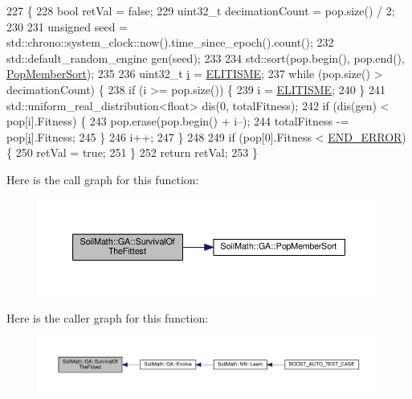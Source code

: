 \begin{DoxyCode}
227                                                                     \{
228   \textcolor{keywordtype}{bool} retVal = \textcolor{keyword}{false};
229   uint32\_t decimationCount = pop.size() / 2;
230 
231   \textcolor{keywordtype}{unsigned} seed = std::chrono::system\_clock::now().time\_since\_epoch().count();
232   std::default\_random\_engine gen(seed);
233 
234   std::sort(pop.begin(), pop.end(), \hyperlink{class_soil_math_1_1_g_a_a1e950022fa3ea792a36cbc62f9b8528b}{PopMemberSort});
235 
236   uint32\_t \hyperlink{_comparision_pictures_2_createtest_image_8m_a6f6ccfcf58b31cb6412107d9d5281426}{i} = \hyperlink{_soil_math_types_8h_aa2f6faf3ad4bc7b9d4df4f766203a2ff}{ELITISME};
237   \textcolor{keywordflow}{while} (pop.size() > decimationCount) \{
238     \textcolor{keywordflow}{if} (i >= pop.size()) \{
239       i = \hyperlink{_soil_math_types_8h_aa2f6faf3ad4bc7b9d4df4f766203a2ff}{ELITISME};
240     \}
241     std::uniform\_real\_distribution<float> dis(0, totalFitness);
242     \textcolor{keywordflow}{if} (dis(gen) < pop[i].Fitness) \{
243       pop.erase(pop.begin() + i--);
244       totalFitness -= pop[\hyperlink{_comparision_pictures_2_createtest_image_8m_a6f6ccfcf58b31cb6412107d9d5281426}{i}].Fitness;
245     \}
246     i++;
247   \}
248 
249   \textcolor{keywordflow}{if} (pop[0].Fitness < \hyperlink{_soil_math_types_8h_ae9ddcafe7b5c7bc5956b50623aa31747}{END\_ERROR}) \{
250     retVal = \textcolor{keyword}{true};
251   \}
252   \textcolor{keywordflow}{return} retVal;
253 \}
\end{DoxyCode}


Here is the call graph for this function\+:\nopagebreak
\begin{figure}[H]
\begin{center}
\leavevmode
\includegraphics[width=350pt]{class_soil_math_1_1_g_a_ac2c10631815408d044738f678c67e98b_cgraph}
\end{center}
\end{figure}




Here is the caller graph for this function\+:\nopagebreak
\begin{figure}[H]
\begin{center}
\leavevmode
\includegraphics[width=350pt]{class_soil_math_1_1_g_a_ac2c10631815408d044738f678c67e98b_icgraph}
\end{center}
\end{figure}




